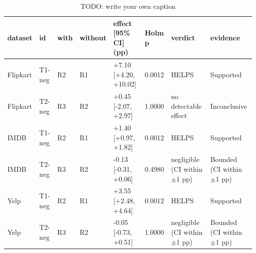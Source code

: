 \begin{table}
\caption{TODO: write your own caption}\label{tab:T03-negation-subset-tests}
\scriptsize
\begin{tabularx}{\textheight}{llllll>{\raggedright\arraybackslash}X>{\raggedright\arraybackslash}X}
\toprule
dataset & id & with & without & effect [95\% CI] (pp) & Holm p & verdict & evidence \\
\midrule
Flipkart & T1-neg & R2 & R1 & +7.10 [+4.20, +10.02] & 0.0012 & HELPS & Supported \\
Flipkart & T2-neg & R3 & R2 & +0.45 [-2.07, +2.97] & 1.0000 & no detectable effect & Inconclusive \\
IMDB & T1-neg & R2 & R1 & +1.40 [+0.97, +1.82] & 0.0012 & HELPS & Supported \\
IMDB & T2-neg & R3 & R2 & -0.13 [-0.31, +0.06] & 0.4980 & negligible (CI within $\pm$1 pp) & Bounded (CI within $\pm$1 pp) \\
Yelp & T1-neg & R2 & R1 & +3.55 [+2.48, +4.64] & 0.0012 & HELPS & Supported \\
Yelp & T2-neg & R3 & R2 & -0.05 [-0.73, +0.51] & 1.0000 & negligible (CI within $\pm$1 pp) & Bounded (CI within $\pm$1 pp) \\
\bottomrule
\end{tabularx}
\par{}
\end{table}
